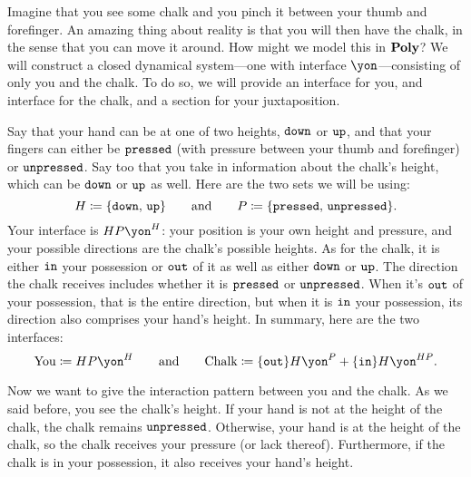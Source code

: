 \documentclass[Book-Poly]{subfiles}
\begin{document}


\begin{example}\label{ex.pickup_chalk}
Imagine that you see some chalk and you pinch it between your thumb and forefinger.
An amazing thing about reality is that you will then have the chalk, in the sense that you can move it around.
How might we model this in $\mathbf{Poly}$?
We will construct a closed dynamical system---one with interface $\yon$---consisting of only you and the chalk.
To do so, we will provide an interface for you, and interface for the chalk, and a section for your juxtaposition.

Say that your hand can be at one of two heights, $\texttt{down}$ or $\texttt{up}$, and that your fingers can either be $\texttt{pressed}$ (with pressure between your thumb and forefinger) or $\texttt{unpressed}$. Say too that you take in information about the chalk's height, which can be $\texttt{down}$ or $\texttt{up}$ as well. Here are the two sets we will be using:
\[
	H\coloneqq\{\texttt{down},\,\texttt{up}\}
	\qquad\text{and}\qquad
	P\coloneqq\{\texttt{pressed},\,\texttt{unpressed}\}.
\]
Your interface is $HP\yon^H$: your position is your own height and pressure, and your possible directions are the chalk's possible heights.
As for the chalk, it is either $\texttt{in}$ your possession or $\texttt{out}$ of it as well as either $\texttt{down}$ or $\texttt{up}$.
The direction the chalk receives includes whether it is $\texttt{pressed}$ or $\texttt{unpressed}$.
When it's $\texttt{out}$ of your possession, that is the entire direction, but when it is $\texttt{in}$ your possession, its direction also comprises your hand's height.
In summary, here are the two interfaces:
\[
	\text{You}\coloneqq HP\yon^H
	\qqand
	\text{Chalk}\coloneqq \{\const{out}\}H\yon^P + \{\const{in}\}H\yon^{HP}.
\]

Now we want to give the interaction pattern between you and the chalk.
As we said before, you see the chalk's height.
If your hand is not at the height of the chalk, the chalk remains $\texttt{unpressed}$.
Otherwise, your hand is at the height of the chalk, so the chalk receives your pressure (or lack thereof).
Furthermore, if the chalk is in your possession, it also receives your hand's height.


\end{example}
\end{document}
